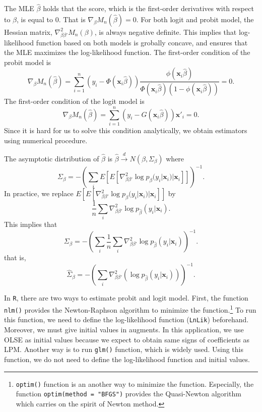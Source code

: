 \documentclass[
  12pt,
]{article}
\begin{document}
The MLE \(\hat{\beta}\) holds that the score, which is the first-order derivatives with respect to \(\beta\), is equal to 0.
That is \(\nabla_{\beta} M_n(\hat{\beta}) = 0\).
For both logit and probit model,
the Hessian matrix, \(\nabla^2_{\beta\beta'} M_n(\beta)\), is always negative definite.
This implies that log-likelihood function based on both models is grobally concave,
and ensures that the MLE maximizes the log-likelihood function.
The first-order condition of the probit model is
\begin{equation*}
  \nabla_{\beta} M_n(\hat{\beta}) 
  = \sum_{i = 1}^n \left( y_i - \Phi(\mathbf{x}_i \hat{\beta}) \right) 
  \frac{\phi(\mathbf{x}_i \hat{\beta})}{\Phi(\mathbf{x}_i \hat{\beta})(1 - \phi(\mathbf{x}_i \hat{\beta}))} = 0.
\end{equation*}
The first-order condition of the logit model is
\begin{equation*}
  \nabla_{\beta} M_n(\hat{\beta}) 
  = \sum_{i = 1}^n \left( y_i - G(\mathbf{x}_i \hat{\beta}) \right) \mathbf{x}'_i = 0.
\end{equation*}
Since it is hard for us to solve this condition analytically,
we obtain estimators using numerical procedure.

The asymptotic distribution of \(\hat{\beta}\) is \(\hat{\beta} \overset{d}{\to} N(\beta, \Sigma_{\beta})\) where
\begin{equation*}
  \Sigma_{\beta} = - \left( \sum_i E[E[ \nabla^2_{\beta\beta'} \log p_{\beta}(y_i | \mathbf{x}_i) | \mathbf{x}_i ]] \right)^{-1}.
\end{equation*}
In practice, we replace \(E[E[ \nabla^2_{\beta\beta'} \log p_{\beta}(y_i | \mathbf{x}_i) | \mathbf{x}_i ]]\) by
\begin{equation*}
  \frac{1}{n} \sum_i \nabla^2_{\beta\beta'} \log p_{\hat{\beta}}(y_i | \mathbf{x}_i).
\end{equation*}
This implies that
\begin{equation*}
  \Sigma_{\beta} = - \left( \sum_i \frac{1}{n} \sum_i \nabla^2_{\beta\beta'} \log p_{\hat{\beta}}(y_i | \mathbf{x}_i) \right)^{-1}.
\end{equation*}
that is,
\begin{equation*}
  \hat{\Sigma}_{\beta} = -\left( \sum_i \nabla^2_{\beta\beta'} (\log p_{\hat{\beta}}(y_i | \mathbf{x}_i)) \right)^{-1}.
\end{equation*}

In \texttt{R}, there are two ways to estimate probit and logit model.
First, the function \texttt{nlm()} provides the Newton-Raphson algorithm to minimize the function.\footnote{\texttt{optim()} function is an another way to minimize the function. Especially, the function \texttt{optim(method\ =\ "BFGS")} provides the Quasi-Newton algorithm which carries on the spirit of Newton method.}
To run this function, we need to define the log-likelihood function (\texttt{LnLik}) beforehand.
Moreover, we must give initial values in augments.
In this application, we use OLSE as initial values
because we expect to obtain same signs of coefficients as LPM.
Another way is to run \texttt{glm()} function, which is widely used.
Using this function, we do not need to define the log-likelihood function and initial values.
\end{document}
